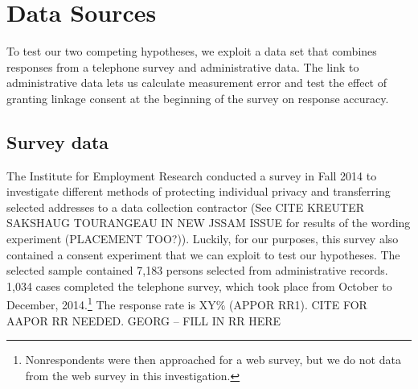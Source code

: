 


\section{Data Sources}
To test our two competing hypotheses, we exploit a data set that combines responses from a telephone survey and administrative data. The link to administrative data lets us calculate measurement error and test the effect of granting linkage consent at the beginning of the survey on response accuracy.

\subsection {Survey data}\label{sec:survey}
The Institute for Employment Research conducted a survey in Fall 2014 to investigate different methods of protecting individual privacy and transferring selected addresses to a data collection contractor (See CITE KREUTER SAKSHAUG TOURANGEAU IN NEW JSSAM ISSUE for results of the wording experiment (PLACEMENT TOO?)). Luckily, for our purposes, this survey also contained a consent experiment that we can exploit to test our hypotheses. The selected sample contained 7,183 persons selected from administrative records. 1,034 cases completed the telephone survey, which took place from October to December, 2014.\footnote{Nonrespondents were then approached for a web survey, but we do not data from the web survey in this investigation.} The response rate is XY\% (APPOR RR1). CITE FOR AAPOR RR NEEDED. GEORG -- FILL IN RR HERE

